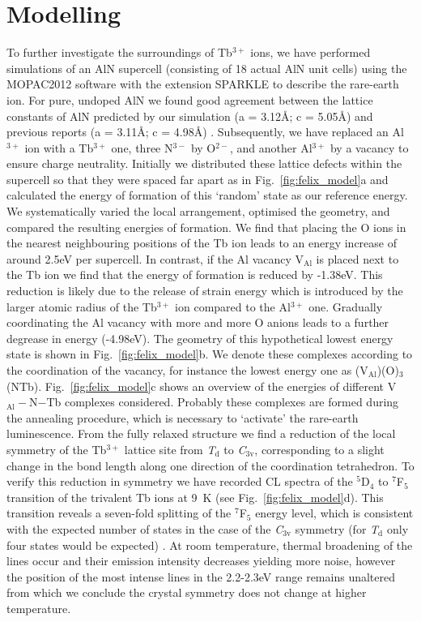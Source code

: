\documentclass[%
aip,
rsi,%
 amsmath,amssymb,%
 reprint,%
]{revtex4-1}
\begin{document}
\section{Modelling}
\label{sec:model}

To further investigate the surroundings of Tb$^{3+}$ ions, we have performed simulations of an AlN supercell (consisting of 18 actual AlN unit cells) using the MOPAC2012 software \cite{steward12} with the extension SPARKLE \cite{freire10} to describe the rare-earth ion. For pure, undoped AlN we found good agreement between the lattice constants of AlN predicted by our simulation (a = 3.12\AA; c = 5.05\AA) and previous reports (a = 3.11\AA; c = 4.98\AA) \cite{ICDD11}. Subsequently, we have replaced an Al$^{3+}$ ion with a Tb$^{3+}$ one, three N$^{3-}$ by O$^{2-}$, and another Al$^{3+}$ by a vacancy to ensure charge neutrality. Initially we distributed these lattice defects within the supercell so that they were spaced far apart as in Fig.~\ref{fig:felix_model}a and calculated the energy of formation of this \lq{random}\rq{} state as our reference energy. We systematically varied the local arrangement, optimised the geometry, and compared the resulting energies of formation. We find that placing the O ions in the nearest neighbouring positions of the Tb ion leads to an energy increase of around 2.5eV per supercell. In contrast, if the Al vacancy V$_\text{Al}$ is placed next to the Tb ion we find that the energy of formation is reduced by -1.38eV. This reduction is likely due to the release of strain energy which is introduced by the larger atomic radius of the Tb$^{3+}$ ion compared to the Al$^{3+}$ one. Gradually coordinating the Al vacancy with more and more O anions leads to a further degrease in energy (-4.98eV). The geometry of this hypothetical lowest energy state is shown in Fig.~\ref{fig:felix_model}b. We denote these complexes according to the coordination of the vacancy, for instance the lowest energy one as (V$_\text{Al}$)(O)$_3$(NTb). Fig.~\ref{fig:felix_model}c shows an overview of the energies of different V$_\text{Al}-$N$-$Tb complexes considered. Probably these complexes are formed during the annealing procedure, which is necessary to \lq{activate}\rq{} the rare-earth luminescence. From the fully relaxed structure we find a reduction of the local symmetry of the Tb$^{3+}$ lattice site from \textit{T$_\text{d}$} to \textit{C$_\text{3v}$}, corresponding to a slight change in the bond length along one direction of the coordination tetrahedron. To verify this reduction in symmetry we have recorded CL spectra of the $^5$D$_4$ to $^7$F$_5$ transition of the trivalent Tb ions at 9~K (see Fig.~\ref{fig:felix_model}d). This transition reveals a seven-fold splitting of the $^7$F$_5$ energy level, which is consistent with the expected number of states in the case of the \textit{C$_\text{3v}$} symmetry (for \textit{T$_\text{d}$} only four states would be expected) \cite{henderson05}. At room temperature, thermal broadening of the lines occur and their emission intensity decreases yielding more noise, however the position of the most intense lines in the 2.2-2.3eV range remains unaltered from which we conclude the crystal symmetry does not change at higher temperature.
\end{document}
